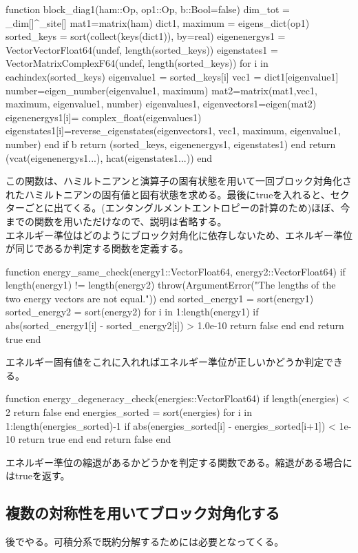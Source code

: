 \documentclass{ltjsarticle}
\begin{document}
\begin{jllisting}
function block_diag1(ham::Op, op1::Op, b::Bool=false)
  dim_tot = _dim[]^_site[]
  mat1=matrix(ham)
  dict1, maximum = eigens_dict(op1)
  sorted_keys = sort(collect(keys(dict1)), by=real)
  eigenenergys1 = Vector{Vector{Float64}}(undef, length(sorted_keys))
  eigenstates1 = Vector{Matrix{ComplexF64}}(undef, length(sorted_keys))
  for i in eachindex(sorted_keys)
    eigenvalue1 = sorted_keys[i]
    vec1 = dict1[eigenvalue1]
    number=eigen_number(eigenvalue1, maximum)
    mat2=matrix(mat1,vec1, maximum, eigenvalue1, number)
    eigenvalues1, eigenvectors1=eigen(mat2)
    eigenenergys1[i]= complex_float(eigenvalues1)
    eigenstates1[i]=reverse_eigenstates(eigenvectors1, vec1, maximum, eigenvalue1, number)
  end
  if b
    return (sorted_keys, eigenenergys1, eigenstates1)
  end
  return (vcat(eigenenergys1...), hcat(eigenstates1...))
end
\end{jllisting}
この関数は、ハミルトニアンと演算子の固有状態を用いて一回ブロック対角化されたハミルトニアンの固有値と固有状態を求める。最後にtrueを入れると、セクターごとに出てくる。(エンタングルメントエントロピーの計算のため)ほぼ、今までの関数を用いただけなので、説明は省略する。\\
エネルギー準位はどのようにブロック対角化に依存しないため、エネルギー準位が同じであるか判定する関数を定義する。
\begin{jllisting}
function energy_same_check(energy1::Vector{Float64}, energy2::Vector{Float64})
  if length(energy1) != length(energy2)
    throw(ArgumentError("The lengths of the two energy vectors are not equal."))
  end
  sorted_energy1 = sort(energy1)
  sorted_energy2 = sort(energy2)
  for i in 1:length(energy1)
    if abs(sorted_energy1[i] - sorted_energy2[i]) > 1.0e-10
      return false
    end
  end
  return true
end
\end{jllisting}
エネルギー固有値をこれに入れればエネルギー準位が正しいかどうか判定できる。\\
\begin{jllisting}
function energy_degeneracy_check(energies::Vector{Float64})
  if length(energies) < 2
    return false
  end
  energies_sorted = sort(energies)
  for i in 1:length(energies_sorted)-1
    if abs(energies_sorted[i] - energies_sorted[i+1]) < 1e-10
      return true
    end
  end
  return false
end
\end{jllisting}
エネルギー準位の縮退があるかどうかを判定する関数である。縮退がある場合にはtrueを返す。\\
\subsection{複数の対称性を用いてブロック対角化する}
後でやる。可積分系で既約分解するためには必要となってくる。
\end{document}
